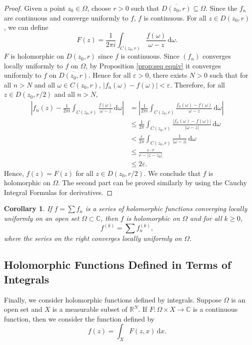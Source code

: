 \documentclass{article}
\newtheorem{corollary}[theorem]{Corollary}
\theoremstyle{definition}
\newcommand{\R}{\mathbb{R}}
\newcommand{\C}{\mathbb{C}}
\newcommand{\dd}{\mathrm{d}}
\renewcommand{\leq}{\leqslant}
\renewcommand{\geq}{\geqslant}
\begin{document}
\begin{proof}
    Given a point \(z_0\in\Omega\), choose \(r>0\) such that \(\overline{D(z_0,r)}\subseteq \Omega\). Since the $f_n$ are continuous and converge uniformly to $f$, $f$ is continuous. For all \(z\in D(z_0,r)\), we can define
    \begin{equation*}
        F(z) = \frac{1}{2\pi i} \int_{C(z_0,r)} \frac{f(\omega)}{\omega-z}\, \dd \omega.
    \end{equation*}
    $F$ is holomorphic on $D(z_0,r)$ since $f$ is continuous. Since \((f_n)\) converges locally uniformly to \(f\) on \(\Omega\), by Proposition \ref{prop:seq equiv} it converges uniformly to \(f\) on \(\overline{D(z_0,r)}\). 
    Hence for all \(\varepsilon>0\), there exists \(N>0\) such that for all \(n>N\) and all \(\omega\in C(z_0,r)\), \(|f_n(\omega)-f(\omega)|<\varepsilon\). Therefore, for all \(z\in D(z_0,r/2)\) and all \(n>N\),
    \begin{align*}
        \left|f_n(z)-\frac{1}{2\pi i} \int_{C(z_0,r)} \frac{f(\omega)}{\omega-z}\, \dd \omega\right| & = \left|\frac{1}{2\pi i} \int_{C(z_0,r)} \frac{f_n(\omega)-f(\omega)}{\omega-z}\, \dd \omega\right|\\
        & \leq \frac{1}{2\pi} \int_{C(z_0,r)} \frac{|f_n(\omega)-f(\omega)|}{|\omega-z|}\, \dd \omega\\
        & < \frac{\varepsilon}{2\pi} \int_{C(z_0,r)} \frac{1}{|\omega-z|}\, \dd \omega\\
        & \leq  \frac{\varepsilon\cdot r}{r-|z-z_0|}\\
        &\leq 2\varepsilon.
    \end{align*}
    Hence, \(f(z)=F(z)\) for all \(z\in D(z_0,r/2)\). We conclude that \(f\) is holomorphic on \(\Omega\). The second part can be proved similarly by using the Cauchy Integral Formulas for derivatives.
\end{proof}
\begin{corollary}
    If $f=\sum f_n$ is a series of holomorphic functions converging locally uniformly on an open set \(\Omega\subset\C\), then \(f\) is holomorphic on \(\Omega\) and for all \(k\geq 0\), 
    \begin{equation*}
        f^{(k)} = \sum f_n^{(k)},
    \end{equation*}
    where the series on the right converges locally uniformly on \(\Omega\).
\end{corollary}


\subsection{Holomorphic Functions Defined in Terms of Integrals}
Finally, we consider holomorphic functions defined by integrals. Suppose $\Omega$ is an open set and $X$ is a measurable subset of $\R^N$. 
If $F\colon\Omega\times X\to\C$ is a continuous function, then we consider the function defined by
\begin{equation*}
    f(z) = \int_X F(z,x)\, \dd x.
\end{equation*}
 
\end{document}
